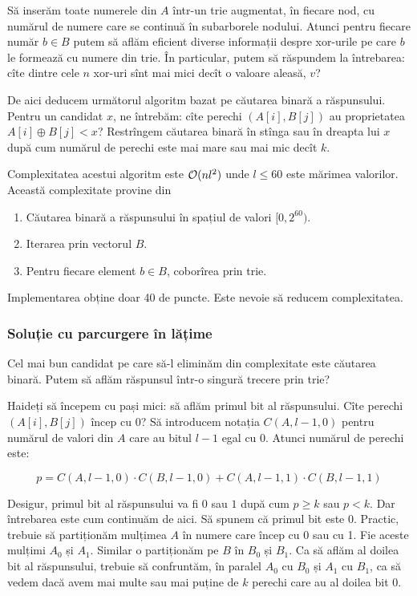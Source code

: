 \documentclass[../main.tex]{subfiles}
\begin{document}
Să inserăm toate numerele din $A$ într-un trie augmentat, în fiecare nod, cu numărul de numere care se continuă în subarborele nodului. Atunci pentru fiecare număr $b \in B$ putem să aflăm eficient diverse informații despre xor-urile pe care $b$ le formează cu numere din trie. În particular, putem să răspundem la întrebarea: cîte dintre cele $n$ xor-uri sînt mai mici decît o valoare aleasă, $v$?

De aici deducem următorul algoritm bazat pe căutarea binară a răspunsului. Pentru un candidat $x$, ne întrebăm: cîte perechi $(A[i], B[j])$ au proprietatea $A[i] \oplus B[j] < x$? Restrîngem căutarea binară în stînga sau în dreapta lui $x$ după cum numărul de perechi este mai mare sau mai mic decît $k$.

Complexitatea acestui algoritm este $\mathcal{O}(n l^2)$ unde $l \leq 60$ este mărimea valorilor. Această complexitate provine din

\begin{enumerate}
  \item Căutarea binară a răspunsului în spațiul de valori $[0, 2^{60})$.
  \item Iterarea prin vectorul $B$.
  \item Pentru fiecare element $b \in B$, coborîrea prin trie.
\end{enumerate}

Implementarea obține doar 40 de puncte. Este nevoie să reducem complexitatea.

\subsubsection*{Soluție cu parcurgere în lățime}

Cel mai bun candidat pe care să-l eliminăm din complexitate este căutarea binară. Putem să aflăm răspunsul într-o singură trecere prin trie?

Haideți să începem cu pași mici: să aflăm primul bit al răspunsului. Cîte perechi $(A[i], B[j])$ încep cu 0? Să introducem notația $C(A, l-1, 0)$ pentru numărul de valori din $A$ care au bitul $l-1$ egal cu 0. Atunci numărul de perechi este:

$$p = C(A, l-1, 0) \cdot C(B, l-1, 0) + C(A, l-1, 1) \cdot C(B, l-1, 1)$$

Desigur, primul bit al răspunsului va fi $0$ sau $1$ după cum $p \geq k$ sau $p < k$. Dar întrebarea este cum continuăm de aici. Să spunem că primul bit este 0. Practic, trebuie să partiționăm mulțimea $A$ în numere care încep cu 0 sau cu 1. Fie aceste mulțimi $A_0$ și $A_1$. Similar o partiționăm pe $B$ în $B_0$ și $B_1$. Ca să aflăm al doilea bit al răspunsului, trebuie să confruntăm, în paralel $A_0$ cu $B_0$ și $A_1$ cu $B_1$, ca să vedem dacă avem mai multe sau mai puține de $k$ perechi care au al doilea bit 0.
\end{document}
